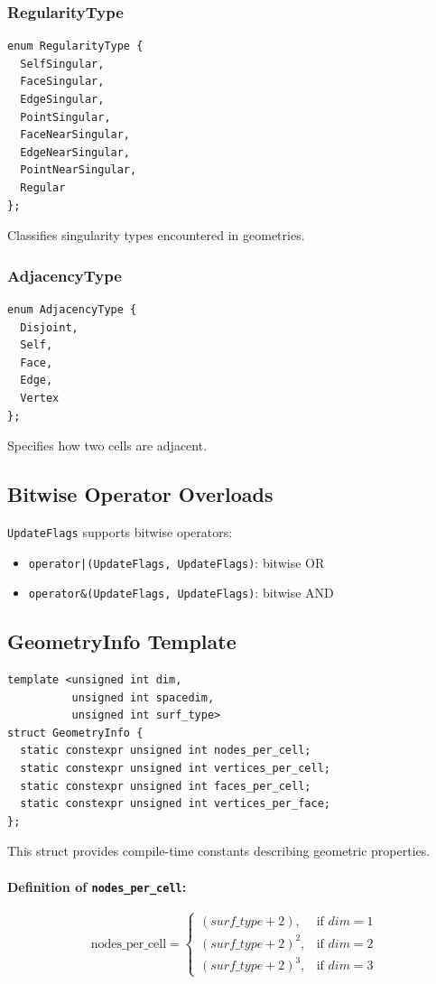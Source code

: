 \documentclass{article}
\begin{document}
\subsubsection*{RegularityType}
\begin{verbatim}
enum RegularityType {
  SelfSingular,
  FaceSingular,
  EdgeSingular,
  PointSingular,
  FaceNearSingular,
  EdgeNearSingular,
  PointNearSingular,
  Regular
};
\end{verbatim}
Classifies singularity types encountered in geometries.

\subsubsection*{AdjacencyType}
\begin{verbatim}
enum AdjacencyType {
  Disjoint,
  Self,
  Face,
  Edge,
  Vertex
};
\end{verbatim}
Specifies how two cells are adjacent.

\subsection{Bitwise Operator Overloads}

\texttt{UpdateFlags} supports bitwise operators:
\begin{itemize}
  \item \texttt{operator|(UpdateFlags, UpdateFlags)}: bitwise OR
  \item \texttt{operator\&(UpdateFlags, UpdateFlags)}: bitwise AND
\end{itemize}

\subsection{GeometryInfo Template}
\begin{verbatim}
template <unsigned int dim,
          unsigned int spacedim,
          unsigned int surf_type>
struct GeometryInfo {
  static constexpr unsigned int nodes_per_cell;
  static constexpr unsigned int vertices_per_cell;
  static constexpr unsigned int faces_per_cell;
  static constexpr unsigned int vertices_per_face;
};
\end{verbatim}

This struct provides compile-time constants describing geometric properties.

\paragraph{Definition of \texttt{nodes\_per\_cell}:}
\[
\text{nodes\_per\_cell} =
\begin{cases}
(surf\_type + 2), & \text{if } dim = 1\\[6pt]
(surf\_type + 2)^2, & \text{if } dim = 2\\[6pt]
(surf\_type + 2)^3, & \text{if } dim = 3
\end{cases}
\]
\end{document}
